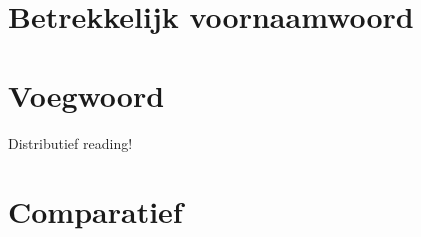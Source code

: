\section{Betrekkelijk voornaamwoord}
\section{Voegwoord}
Distributief reading!


\section{Comparatief}


